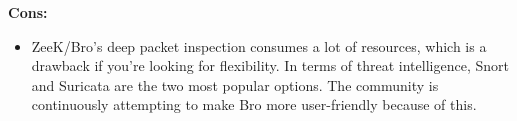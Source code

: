 \documentclass[conference]{IEEEtran}
\begin{document}
{\bfseries{Cons:}}

\begin{itemize}
    \item ZeeK/Bro's deep packet inspection consumes a lot of resources, which is a drawback if you're looking for flexibility. In terms of threat intelligence, Snort and Suricata are the two most popular options. The community is continuously attempting to make Bro more user-friendly because of this.
\end{itemize}

\newpage
\newpage

\newcommand{\noroffcount}[1]{%
\immediate\write18{texcount -v0 -q -total  -sum -merge -q #1.tex > #1-words.noroff }%
}
%
%

\newcommand{\NUCwordcount}[1]{
    \section*{Word count metrics}
    \framebox{%
    \begin{minipage}{0.95\textwidth}
    \textbf{NUC Studio2 Word Count}:\\
    \noroffcount{#1}
    NOTE: References are excluded.
    \end{minipage}}
}

\newpage
\end{document}
